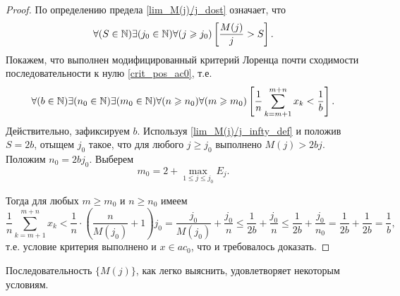 \begin{proof}
	По определению предела \eqref{lim_M(j)/j_dost} означает, что
	\begin{equation}\label{lim_M(j)/j_infty_def}
		\forall(S  \in\N)
		\exists(j_0\in\N)
		\forall(j \geq j_0)
		\left[
			\frac{M(j)}{j}>S
		\right]
		.
	\end{equation}
	Покажем, что выполнен модифицированный критерий Лоренца почти сходимости последовательности к нулю
	\eqref{crit_pos_ac0}, т.е.
	\begin{equation}
		\forall(b  \in\N)
		\exists(n_0\in\N)
		\exists(m_0\in\N)
		\forall(n\geq n_0)
		\forall(m\geq m_0)
		\\
		\left[
			\frac{1}{n}
			\sum_{k=m+1}^{m+n} x_k
			<
			\frac{1}{b}
		\right]
		.
	\end{equation} Действительно, зафиксируем $b$.
	Используя \eqref{lim_M(j)/j_infty_def} и положив $S=2b$,
	отыщем $j_0$ такое, что для любого $j\geq j_0$ выполнено
	$M(j)>2bj$.
	Положим $n_0 = 2bj_0$.
	Выберем
	$$
		m_0 = 2+\max_{1\leq j \leq j_0} E_j
		.
	$$

	Тогда для любых $m\geq m_0$ и $n\geq n_0$ имеем
	\begin{equation}
		\frac{1}{n} \sum_{k=m+1}^{m+n} x_k
		<
		\frac{1}{n} \cdot \left( \frac{n}{M(j_0)} + 1 \right) j_0
		=
		\frac{j_0}{M(j_0)} + \frac{j_0}{n}
		\leq
		\frac{1}{2b} + \frac{j_0}{n}
		\leq
		\frac{1}{2b} + \frac{j_0}{n_0}
		=
		\frac{1}{2b} + \frac{1}{2b}
		=
		\frac{1}{b}
		,
	\end{equation}
	т.е. условие критерия выполнено
	и $x\in ac_0$,
	что и требовалось доказать.
\end{proof}

Последовательность $\{M(j)\}$, как легко выяснить, удовлетворяет некоторым условиям.
